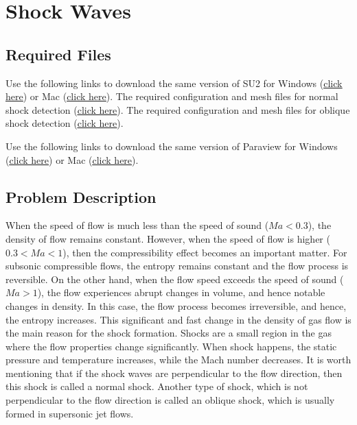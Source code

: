 \chapter{Shock Waves}
\label{ch:Shock Waves}
\section{Required Files}
\begin{su2note}
	Use the following links to download the same version of SU2 for Windows (\href{https://users.encs.concordia.ca/~bvermeir/book/executables/windows/SU2_Windows.zip}{\underline{click here}}) or Mac (\href{https://users.encs.concordia.ca/~bvermeir/book/executables/osx/SU2_Mac.zip}{\underline{click here}}).
	The required configuration and mesh files for normal shock detection (\href{https://gitlab.com/bvermeir/book-cfd/blob/master/tutorial/tut7_shock_wave/normal_shock.zip}{\underline{click here}}).
	The required configuration and mesh files for oblique shock detection (\href{https://gitlab.com/bvermeir/book-cfd/blob/master/tutorial/tut7_shock_wave/oblique_shock.zip}{\underline{click here}}).	
\end{su2note}
\begin{paraviewnote}
	Use the following links to download the same version of Paraview for Windows (\href{https://users.encs.concordia.ca/~bvermeir/book/executables/windows/ParaView-5.4.0-Qt5-OpenGL2-Windows-64bit.exe}{\underline{click here}}) or Mac (\href{https://users.encs.concordia.ca/~bvermeir/book/executables/osx/ParaView-5.4.0-Qt5-OpenGL2-MPI-OSX10.8-64bit.dmg}{\underline{click here}}).
\end{paraviewnote}


\section{Problem Description}
When the speed of flow is much less than the speed of sound ($Ma<0.3$), the density of flow remains constant. However, when the speed of flow is higher ($0.3<Ma<1$), then the compressibility effect becomes an important matter. For subsonic compressible flows, the entropy remains constant and the flow process is reversible. On the other hand, when the flow speed exceeds the speed of sound ($Ma>1$), the flow experiences abrupt changes in volume, and hence notable changes in density. In this case, the flow process becomes irreversible, and hence, the entropy increases. This significant and fast change in the density of gas flow is the main reason for the shock formation. Shocks are a small region in the gas where the flow properties change significantly. When shock happens, the static pressure and temperature increases, while the Mach number decreases. It is worth mentioning that if the shock waves are perpendicular to the flow direction, then this shock is called a normal shock. Another type of shock, which is not perpendicular to the flow direction is called an oblique shock, which is usually formed in supersonic jet flows.

